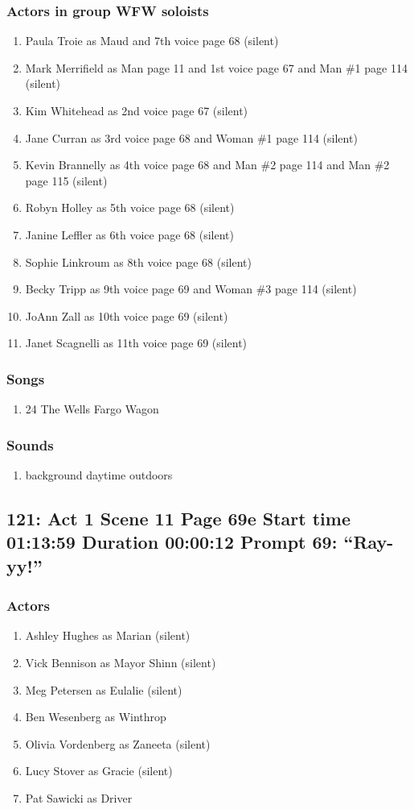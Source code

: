 \subsubsection{Actors in group WFW soloists}
\begin{enumerate}
\item Paula Troie as Maud and 7th voice page 68 (silent)
\item Mark Merrifield as Man page 11 and 1st voice page 67 and Man \#1 page 114 (silent)
\item Kim Whitehead as 2nd voice page 67 (silent)
\item Jane Curran as 3rd voice page 68 and Woman \#1 page 114 (silent)
\item Kevin Brannelly as 4th voice page 68 and Man \#2 page 114 and Man \#2 page 115 (silent)
\item Robyn Holley as 5th voice page 68 (silent)
\item Janine Leffler as 6th voice page 68 (silent)
\item Sophie Linkroum as 8th voice page 68 (silent)
\item Becky Tripp as 9th voice page 69 and Woman \#3 page 114 (silent)
\item JoAnn Zall as 10th voice page 69 (silent)
\item Janet Scagnelli as 11th voice page 69 (silent)
\end{enumerate}

\subsubsection{Songs}
\begin{enumerate}
\item 24 The Wells Fargo Wagon
\end{enumerate}\subsubsection{Sounds}
\begin{enumerate}
\item background daytime outdoors
\end{enumerate}
\subsection{121: Act 1 Scene 11 Page 69e Start time 01:13:59 Duration 00:00:12 Prompt 69: ``Ray-yy!''}

\subsubsection{Actors}
\begin{enumerate}
\item Ashley Hughes as Marian (silent)
\item Vick Bennison as Mayor Shinn (silent)
\item Meg Petersen as Eulalie (silent)
\item Ben Wesenberg as Winthrop
\item Olivia Vordenberg as Zaneeta (silent)
\item Lucy Stover as Gracie (silent)
\item Pat Sawicki as Driver
\end{enumerate}

